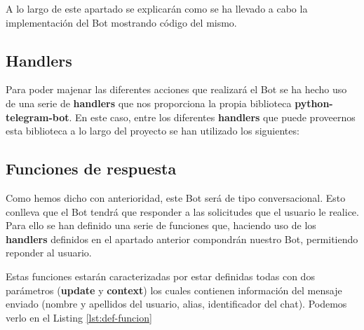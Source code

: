 A lo largo de este apartado se explicarán como se ha llevado a cabo la implementación del Bot mostrando código del mismo.

\subsection{Handlers}

Para poder majenar las diferentes acciones que realizará el Bot se ha hecho uso de una serie de \textbf{handlers} que nos proporciona la propia biblioteca \textbf{python-telegram-bot}. En este caso, entre los diferentes \textbf{handlers} que puede proveernos esta biblioteca a lo largo del proyecto se han utilizado los siguientes:


\subsection{Funciones de respuesta}

Como hemos dicho con anterioridad, este Bot será de tipo conversacional. Esto conlleva que el Bot tendrá que responder a las solicitudes que el usuario le realice. Para ello se han definido una serie de funciones que, haciendo uso de los \textbf{handlers} definidos en el apartado anterior compondrán nuestro Bot, permitiendo reponder al usuario.

Estas funciones estarán caracterizadas por estar definidas todas con dos parámetros (\textbf{update} y \textbf{context}) los cuales contienen información del mensaje enviado (nombre y apellidos del usuario, alias, identificador del chat). Podemos verlo en el Listing \ref{lst:def-funcion}

